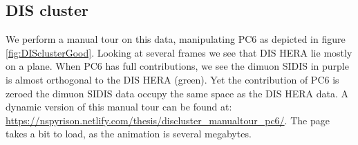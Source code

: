 \documentclass{monashthesis}
\begin{document}
\subsection{DIS cluster}\label{dis-cluster}

We perform a manual tour on this data, manipulating PC6 as depicted in
figure \ref{fig:DISclusterGood}. Looking at several frames we see that
DIS HERA lie mostly on a plane. When PC6 has full contributions, we see
the dimuon SIDIS in purple is almost orthogonal to the DIS HERA (green).
Yet the contribution of PC6 is zeroed the dimuon SIDIS data occupy the
same space as the DIS HERA data. A dynamic version of this manual tour
can be found at:
\url{https://nspyrison.netlify.com/thesis/discluster_manualtour_pc6/}.
The page takes a bit to load, as the animation is several megabytes.
\end{document}
